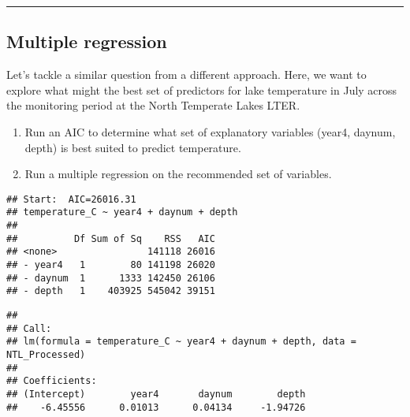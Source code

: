 \documentclass[
]{article}
\newenvironment{Shaded}{\begin{snugshade}}{\end{snugshade}}
\newcommand{\CommentTok}[1]{\textcolor[rgb]{0.56,0.35,0.01}{\textit{#1}}}
\newcommand{\DataTypeTok}[1]{\textcolor[rgb]{0.13,0.29,0.53}{#1}}
\newcommand{\KeywordTok}[1]{\textcolor[rgb]{0.13,0.29,0.53}{\textbf{#1}}}
\newcommand{\NormalTok}[1]{#1}
\newcommand{\OperatorTok}[1]{\textcolor[rgb]{0.81,0.36,0.00}{\textbf{#1}}}
\newcommand{\StringTok}[1]{\textcolor[rgb]{0.31,0.60,0.02}{#1}}
\begin{document}
\begin{center}\rule{0.5\linewidth}{0.5pt}\end{center}

\hypertarget{multiple-regression}{%
\subsection{Multiple regression}\label{multiple-regression}}

Let's tackle a similar question from a different approach. Here, we want
to explore what might the best set of predictors for lake temperature in
July across the monitoring period at the North Temperate Lakes LTER.

\begin{enumerate}
\def\labelenumi{\arabic{enumi}.}
\setcounter{enumi}{8}
\item
  Run an AIC to determine what set of explanatory variables (year4,
  daynum, depth) is best suited to predict temperature.
\item
  Run a multiple regression on the recommended set of variables.
\end{enumerate}

\begin{Shaded}
\end{Shaded}

\begin{verbatim}
## Start:  AIC=26016.31
## temperature_C ~ year4 + daynum + depth
## 
##          Df Sum of Sq    RSS   AIC
## <none>                141118 26016
## - year4   1        80 141198 26020
## - daynum  1      1333 142450 26106
## - depth   1    403925 545042 39151
\end{verbatim}

\begin{verbatim}
## 
## Call:
## lm(formula = temperature_C ~ year4 + daynum + depth, data = NTL_Processed)
## 
## Coefficients:
## (Intercept)        year4       daynum        depth  
##    -6.45556      0.01013      0.04134     -1.94726
\end{verbatim}
\end{document}
